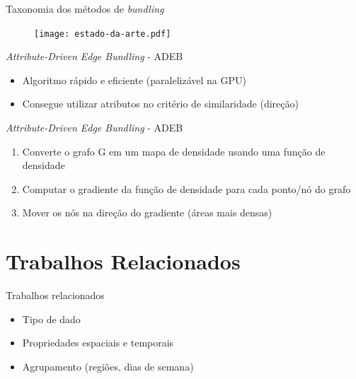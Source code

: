 \begin{frame}{Taxonomia dos métodos de \emph{bundling}}
  \begin{figure}[!htb]
    \centering
    \texttt{[image: estado-da-arte.pdf]}
  \end{figure}

\hfill \citep{Lhuillier2017}
\end{frame}

\begin{frame}{\emph{Attribute-Driven Edge Bundling} - ADEB}
  \begin{itemize}
    \item Algoritmo rápido e eficiente (paralelizável na GPU)
    \item Consegue utilizar atributos no critério de similaridade (direção)
  \end{itemize}
\end{frame}

\begin{frame}{\emph{Attribute-Driven Edge Bundling} - ADEB}
  \begin{enumerate}
    \item Converte o grafo G em um mapa de densidade usando uma função de densidade
    \item Computar o gradiente da função de densidade para cada ponto/nó do grafo
    \item Mover os nós na direção do gradiente (áreas mais densas)
  \end{enumerate}
\end{frame}

\section{Trabalhos Relacionados}

\begin{frame}{Trabalhos relacionados}
  \begin{itemize}
    \item Tipo de dado

    \item Propriedades espaciais e temporais

    \item Agrupamento (regiões, dias de semana)
  \end{itemize}
\end{frame}

